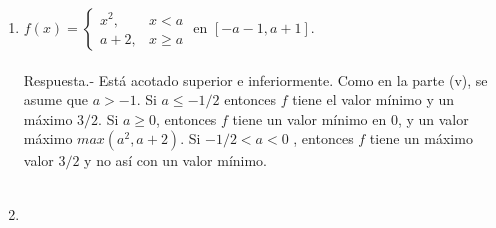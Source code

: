 \begin{enumerate}
\begin{enumerate}[\bfseries (i)]
	\item $f(x) = \left\{\begin{array}{ll}x^2, & x<a \\ a+2, & x\geq a \end{array}\right.$ en $[-a-1,a+1].$\\\\
	    Respuesta.-\; Está acotado superior e inferiormente. Como en la parte (v), se asume que $a>-1$. Si $a\leq -1/2$ entonces $f$ tiene el valor mínimo y un máximo $3/2$. Si $a\geq 0$, entonces $f$ tiene un valor mínimo en $0$, y un valor máximo $max(a^2,a+2)$. Si $-1/2<a<0$ , entonces $f$ tiene un máximo valor $3/2$ y no así con un valor mínimo.\\\\

	\item 

    \end{enumerate}

\end{enumerate}
